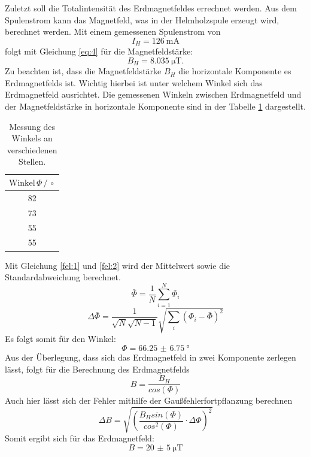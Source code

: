 Zuletzt soll die Totalintensität des Erdmagnetfeldes errechnet werden.
Aus dem Spulenstrom kann das Magnetfeld, was in der Helmholzspule erzeugt wird,
berechnet werden.
Mit einem gemessenen Spulenstrom von
\begin{equation*}
  I_H =\SI{126}{\milli\ampere}
\end{equation*}
folgt mit Gleichung \ref{eq:4} für die Magnetfeldstärke:
\begin{equation*}
  B_H =\SI{8.035}{\micro\tesla}.
\end{equation*}
Zu beachten ist, dass die Magnetfeldstärke $B_H$ die horizontale Komponente es Erdmagnetfelds ist.
Wichtig hierbei ist unter welchem Winkel sich das Erdmagnetfeld ausrichtet.
Die gemessenen Winkeln zwischen Erdmagnetfeld und der Magnetfeldstärke in horizontale Komponente
sind in der Tabelle \ref{tab:7} dargestellt.
\begin{table}[H]
  \centering
  \caption{Messung des Winkels an verschiedenen Stellen.}
  \label{tab:7}
  \begin{tabular}{c}
\toprule
$\text{Winkel}\, \Phi \,/\, \circ$\\
\midrule
82\\
73\\
55\\
55\\
\bottomrule
  \end{tabular}
\end{table}
Mit Gleichung \ref{fel:1} und \ref{fel:2} wird der Mittelwert sowie die Standardabweichung berechnet.
\begin{equation*}
  \bar{\Phi}= \frac{1}{N} \sum_{i=1}^{N} \Phi_{i}
\end{equation*}
\begin{equation*}
\Delta \bar{\Phi} = \frac{1}{\sqrt{N}\sqrt{N-1}} \sqrt{\sum_{i}(\Phi_{i}-\bar{\Phi})^2}
\end{equation*}
Es folgt somit für den Winkel:
\begin{equation*}
  \Phi = \SI{66.25(675)}{\degree}
\end{equation*}
Aus der Überlegung, dass sich das Erdmagnetfeld in zwei Komponente zerlegen lässt, folgt für die Berechnung des Erdmagnetfelds
\begin{equation*}
  B = \frac{B_H}{cos(\Phi)}
\end{equation*}
Auch hier lässt sich der Fehler mithilfe der Gaußfehlerfortpflanzung berechnen
\begin{equation*}
  \Delta B = \sqrt{(\frac{B_H sin(\Phi)}{cos^2(\Phi)} \cdot \Delta \Phi)^2}
\end{equation*}
Somit ergibt sich für das Erdmagnetfeld:
\begin{equation*}
  B= \SI{20(5)}{\micro\tesla}
\end{equation*}
